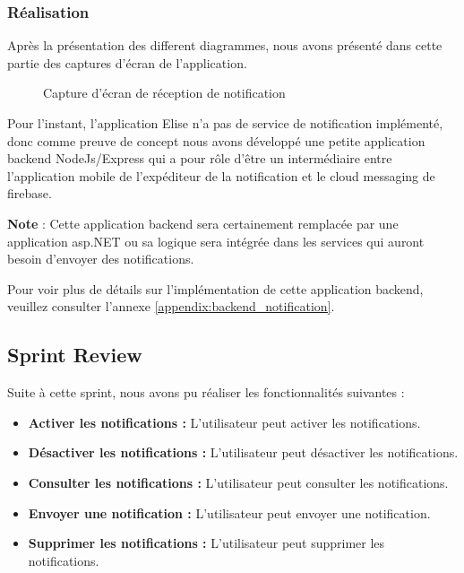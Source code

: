 \subsubsection{Réalisation}

Après la présentation des different diagrammes, nous avons présenté dans cette partie des captures d'écran de l'application.

\begin{figure}[H]
  \centering
  \caption{Capture d'écran de réception de notification}
  \label{fig:realisation_sprint8}
\end{figure}


Pour l'instant, l'application Elise n'a pas de service de notification implémenté, donc comme preuve de concept nous avons développé une petite application backend NodeJs/Express qui a pour rôle d'être un intermédiaire entre l'application mobile de l'expéditeur de la notification et le cloud messaging de firebase.

\textbf{Note} : Cette application backend sera certainement remplacée par une application asp.NET ou sa logique sera intégrée dans les services qui auront besoin d'envoyer des notifications.

Pour voir plus de détails sur l'implémentation de cette application backend, veuillez consulter l'annexe \ref{appendix:backend_notification}.




\subsection{Sprint Review}
Suite à cette sprint, nous avons pu réaliser les fonctionnalités suivantes :
\begin{itemize}
  \item \textbf{Activer les notifications :} L'utilisateur peut activer les notifications.
  \item \textbf{Désactiver les notifications :} L'utilisateur peut désactiver les notifications.
  \item \textbf{Consulter les notifications :} L'utilisateur peut consulter les notifications.
  \item \textbf{Envoyer une notification :} L'utilisateur peut envoyer une notification.
  \item \textbf{Supprimer les notifications :} L'utilisateur peut supprimer les notifications.
\end{itemize}

